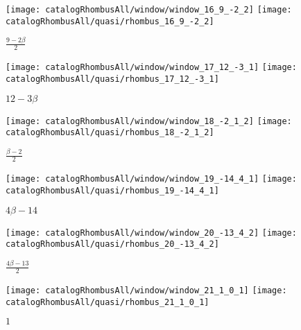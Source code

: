 \documentclass[text.tex]{subfiles}
\begin{document}
\begin{landscape}
\begin{figure}[h]
\centering
\texttt{[image: catalogRhombusAll/window/window\_16\_9\_-2\_2]}
\texttt{[image: catalogRhombusAll/quasi/rhombus\_16\_9\_-2\_2]}
\caption*{$\frac{9-2\beta}{2}$}
\end{figure}

\begin{figure}[h]
\centering
\texttt{[image: catalogRhombusAll/window/window\_17\_12\_-3\_1]}
\texttt{[image: catalogRhombusAll/quasi/rhombus\_17\_12\_-3\_1]}
\caption*{$12-3\beta$}
\end{figure}

\begin{figure}[h]
\centering
\texttt{[image: catalogRhombusAll/window/window\_18\_-2\_1\_2]}
\texttt{[image: catalogRhombusAll/quasi/rhombus\_18\_-2\_1\_2]}
\caption*{$\frac{\beta-2}{2}$}
\end{figure}

\begin{figure}[h]
\centering
\texttt{[image: catalogRhombusAll/window/window\_19\_-14\_4\_1]}
\texttt{[image: catalogRhombusAll/quasi/rhombus\_19\_-14\_4\_1]}
\caption*{$4\beta-14$}
\end{figure}

\begin{figure}[h]
\centering
\texttt{[image: catalogRhombusAll/window/window\_20\_-13\_4\_2]}
\texttt{[image: catalogRhombusAll/quasi/rhombus\_20\_-13\_4\_2]}
\caption*{$\frac{4\beta-13}{2}$}
\end{figure}

\begin{figure}[h]
\centering
\texttt{[image: catalogRhombusAll/window/window\_21\_1\_0\_1]}
\texttt{[image: catalogRhombusAll/quasi/rhombus\_21\_1\_0\_1]}
\caption*{$1$}
\end{figure}
\end{landscape}
\end{document}
